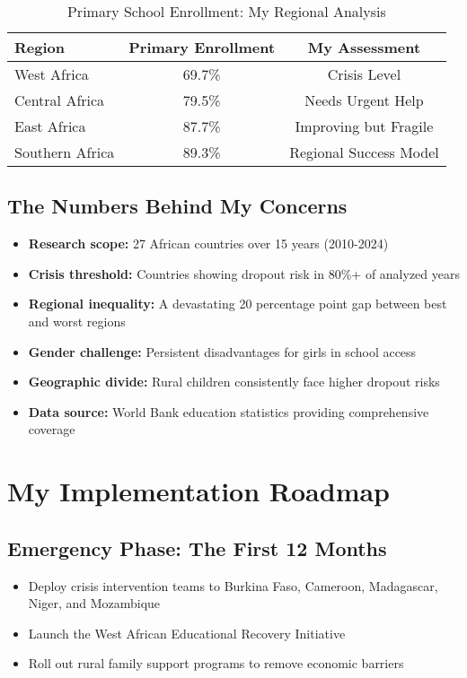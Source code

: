 \documentclass[12pt,a4paper]{article}
\begin{document}
\begin{table}[h]
\centering
\begin{tabular}{|l|c|c|}
\hline
\textbf{Region} & \textbf{Primary Enrollment} & \textbf{My Assessment} \\
\hline
West Africa & 69.7\% & Crisis Level \\
Central Africa & 79.5\% & Needs Urgent Help \\
East Africa & 87.7\% & Improving but Fragile \\
Southern Africa & 89.3\% & Regional Success Model \\
\hline
\end{tabular}
\caption{Primary School Enrollment: My Regional Analysis}
\end{table}

\subsection{The Numbers Behind My Concerns}

\begin{itemize}
    \item \textbf{Research scope:} 27 African countries over 15 years (2010-2024)
    \item \textbf{Crisis threshold:} Countries showing dropout risk in 80\%+ of analyzed years
    \item \textbf{Regional inequality:} A devastating 20 percentage point gap between best and worst regions
    \item \textbf{Gender challenge:} Persistent disadvantages for girls in school access
    \item \textbf{Geographic divide:} Rural children consistently face higher dropout risks
    \item \textbf{Data source:} World Bank education statistics providing comprehensive coverage
\end{itemize}

\section{My Implementation Roadmap}

\subsection{Emergency Phase: The First 12 Months}
\begin{itemize}
    \item Deploy crisis intervention teams to Burkina Faso, Cameroon, Madagascar, Niger, and Mozambique
    \item Launch the West African Educational Recovery Initiative
    \item Roll out rural family support programs to remove economic barriers
\end{itemize}
\end{document}
